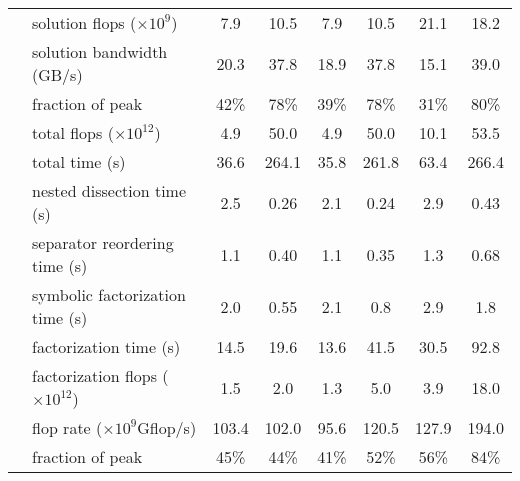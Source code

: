 \documentclass{article}
\begin{document}
\begin{table}[htp!]
\begin{center}
\begin{tabular}{|c|l||c|c|c|c|c|c|}
      \hhline{|~-||-|-|-|-|-|-|}                                                         
      &          solution flops ($\times10^{9}$) &  7.9    &  10.5  &  7.9  & 10.5  &  21.1  &  18.2  \\ 
      \hhline{|~-||-|-|-|-|-|-|}                                                         
      &                solution bandwidth (GB/s) &  20.3  &  37.8  & 18.9  & 37.8   &  15.1  & 39.0  \\ 
      &   \qquad fraction of peak                & 42\%   & 78\%   & 39\% & 78\%    & 31\%   & 80\% \\
      \hhline{|~-||-|-|-|-|-|-|}                                                               
      &          total flops ($\times10^{12}$) &  4.9     & 50.0   & 4.9    &  50.0  & 10.1 & 53.5 \\ 
      \hhline{|~-||-|-|-|-|-|-|}                                                               
      &                         total time (s) &  36.6   & 264.1  &  35.8   & 261.8  & 63.4 & 266.4 \\ 
      \hhline{==::=:=:=:=:=:=}
      \multirow{11}{*}{\rotatebox{90}{Multifrontal + HSS}}                                               
      &              nested dissection time (s) &   2.5   & 0.26    &  2.1   & 0.24  &  2.9  &  0.43 \\ 
      \hhline{|~-||-|-|-|-|-|-|}                                                               
      &            separator reordering time (s) &  1.1   &   0.40   &  1.1   & 0.35   &  1.3  &  0.68 \\ 
      \hhline{|~-||-|-|-|-|-|-|}                                                               
      &         symbolic factorization time (s) &   2.0   &  0.55    &  2.1   &  0.8  &  2.9   &  1.8 \\ 
      \hhline{|~-||-|-|-|-|-|-|}                                                               
      &                  factorization time (s) &  14.5   &  19.6   &  13.6  & 41.5  &  30.5  &  92.8 \\ 
      \hhline{|~-||-|-|-|-|-|-|}                                                               
      &    factorization flops ($\times10^{12}$) &  1.5   &  2.0    &  1.3   &  5.0   &  3.9  & 18.0  \\ 
      &   \qquad flop rate ($\times10^9$Gflop/s) &  103.4 &  102.0  &  95.6  &  120.5 & 127.9 & 194.0 \\
      &   \qquad fraction of peak                &  45\%  &  44\%   &  41\%   & 52\%   &  56\% &  84\% \\

\end{tabular}
\end{center}
\end{table}
\end{document}
